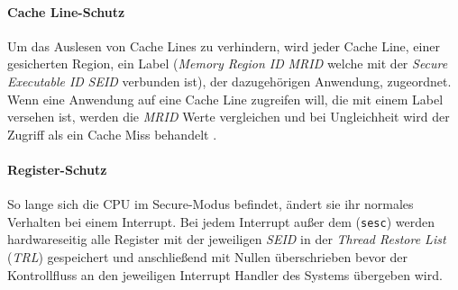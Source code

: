 \documentclass[ngerman]{sig-alternate-05-2015}
\begin{document}
\paragraph{Cache Line-Schutz} Um das Auslesen von Cache Lines zu verhindern, wird jeder Cache Line, einer gesicherten Region, ein Label (\emph{Memory Region ID} \emph{MRID} welche mit der \emph{Secure Executable ID} \emph{SEID} verbunden ist), der dazugehörigen Anwendung, zugeordnet. Wenn eine Anwendung auf eine Cache Line zugreifen will, die mit einem Label versehen ist, werden die \emph{MRID} Werte vergleichen und bei Ungleichheit wird der Zugriff als ein Cache Miss behandelt \cite{boivie2013secureblue++:big}.

\paragraph{Register-Schutz} So lange sich die CPU im Secure-Modus befindet, ändert sie ihr normales Verhalten bei einem Interrupt. Bei jedem Interrupt außer dem (\texttt{sesc}) werden hardwareseitig alle Register mit der jeweiligen \emph{SEID} in der \emph{Thread Restore List} (\emph{TRL}) gespeichert und anschließend mit Nullen überschrieben bevor der Kontrollfluss an den jeweiligen Interrupt Handler des Systems übergeben wird. 
\end{document}
